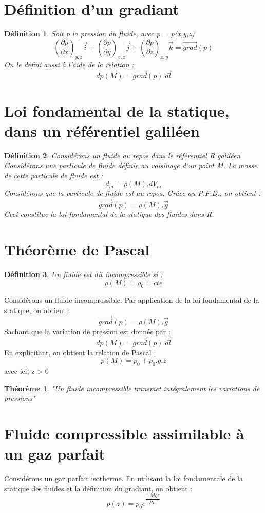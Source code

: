 \documentclass[a4paper,12 pt,oneside]{report}     %
\newtheorem{de}{Définition}
\newtheorem{theo}{Théorème}
\begin{document}
\section{Définition d'un gradiant}
\begin{de}
Soit p la pression du fluide, avec p = p(x,y,z)
 $$(\dfrac{\partial p}{\partial x})_{y,z}\overrightarrow{i} + (\dfrac{\partial p}{\partial y})_{x,z}\overrightarrow{j} + (\dfrac{\partial p}{\partial z})_{x,y}\overrightarrow{k} = \overrightarrow{grad}(p) $$
On le défini aussi à l'aide de la relation : 
$$dp(M) = \overrightarrow{grad}(p).\overrightarrow{dl}$$
\end{de}
\section{Loi fondamental de la statique, dans un référentiel galiléen}
\begin{de}
Considérons un fluide au repos dans le référentiel R galiléen
Considérons une particule de fluide définie au voisinage d'un point M.
La masse de cette particule de fluide est :
$$d_m = \rho(M).dV_m$$
Considérons que la particule de fluide est au repos. Grâce au P.F.D., on obtient : 
$$\overrightarrow{grad}(p) = \rho(M).\overrightarrow{g}$$
Ceci constitue la loi fondamental de la statique des fluides dans R.
\end{de}
\section{Théorème de Pascal}
\begin{de}
Un fluide est dit incompressible si :
$$\rho(M)=\rho_0=cte$$
\end{de}
Considérons un fluide incompressible.
Par application de la loi fondamental de la statique, on obtient : 
$$\overrightarrow{grad}(p) = \rho(M).\overrightarrow{g}$$
Sachant que la variation de pression est donnée par : 
$$dp(M) = \overrightarrow{grad}(p).\overrightarrow{dl}$$
En explicitant, on obtient la relation de Pascal :
$$p(M) = p_0 + \rho_0.g.z$$
avec ici, z > 0
\begin{theo}
"Un fluide incompressible transmet intégralement les variations de pressions"
\end{theo}
\section{Fluide compressible assimilable à un gaz parfait}
Considérons un gaz parfait isotherme.
En utilisant la loi fondamentale de la statique des fluides et la définition du gradiant, on obtient : 
$$p(z) = p_0e^{\dfrac{-Mgz}{Rt_0}}$$
\end{document}
